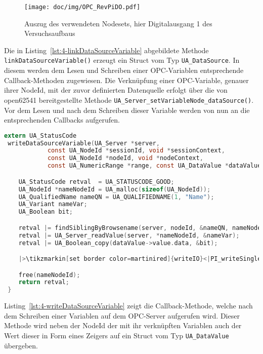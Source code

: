 \begin{figure}[h]
    \centering
    \texttt{[image: doc/img/OPC\_RevPiDO.pdf]}
    \caption{Auszug des verwendeten Nodesets, hier Digitalausgang 1 des Versuchsaufbaus
      \label{fig:opc-do}}
\end{figure}

Die in Listing~\ref{lst:4-linkDataSourceVariable} abgebildete Methode \lstinline{linkDataSourceVariable()} erzeugt ein Struct vom Typ \lstinline{UA_DataSource}. In diesem werden dem Lesen und Schreiben einer OPC-Variablen entsprechende Callback-Methoden zugewiesen. Die Verknüpfung einer OPC-Variable, genauer ihrer NodeId, mit der zuvor definierten Datenquelle erfolgt über die von open62541 bereitgestellte Methode \lstinline{UA_Server_setVariableNode_dataSource()}. Vor dem Lesen und nach dem Schreiben dieser Variable werden von nun an die entsprechenden Callbacks aufgerufen.
     
\begin{lstlisting}[language={c},firstnumber=168,caption={Auszug des Callbacks \lstinline{writeDataSourceVariable} in \lstinline{variables.c}\label{lst:4-writeDataSourceVariable}}]  
extern UA_StatusCode
 writeDataSourceVariable(UA_Server *server,
            const UA_NodeId *sessionId, void *sessionContext,
            const UA_NodeId *nodeId, void *nodeContext,
            const UA_NumericRange *range, const UA_DataValue *dataValue) {

    UA_StatusCode retval  = UA_STATUSCODE_GOOD;
    UA_NodeId *nameNodeId = UA_malloc(sizeof(UA_NodeId));
    UA_QualifiedName nameQN = UA_QUALIFIEDNAME(1, "Name");
    UA_Variant nameVar;
    UA_Boolean bit;

    retval |= findSiblingByBrowsename(server, nodeId, &nameQN, nameNodeId);
    retval |= UA_Server_readValue(server, *nameNodeId, &nameVar);
    retval |= UA_Boolean_copy(dataValue->value.data, &bit);

    |>\tikzmarkin[set border color=martinired]{writeIO}<|PI_writeSingleIO(String_fromUA_String(nameVar.data), &bit, false);                                                 |>\tikzmarkend{writeIO}<|

    free(nameNodeId);
    return retval;
 }
\end{lstlisting}

Listing~\ref{lst:4-writeDataSourceVariable} zeigt die Callback-Methode, welche nach dem Schreiben einer Variablen auf dem OPC-Server aufgerufen wird.
Dieser Methode wird neben der NodeId der mit ihr verknüpften Variablen auch der Wert dieser in Form eines Zeigers auf ein Struct vom Typ \lstinline{UA_DataValue} übergeben.

